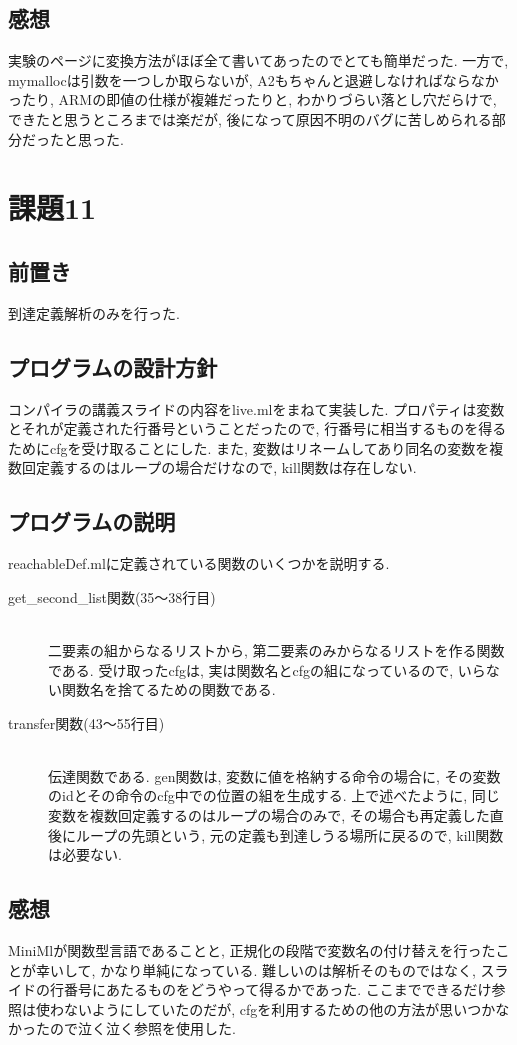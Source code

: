 \documentclass{jarticle}
\begin{document}
\subsection{感想}
実験のページに変換方法がほぼ全て書いてあったのでとても簡単だった. 一方で, mymallocは引数を一つしか取らないが, A2もちゃんと退避しなければならなかったり, ARMの即値の仕様が複雑だったりと, わかりづらい落とし穴だらけで, できたと思うところまでは楽だが, 後になって原因不明のバグに苦しめられる部分だったと思った.


\section{課題11}
\subsection{前置き}
到達定義解析のみを行った. 
\subsection{プログラムの設計方針}
コンパイラの講義スライドの内容をlive.mlをまねて実装した. プロパティは変数とそれが定義された行番号ということだったので, 行番号に相当するものを得るためにcfgを受け取ることにした. また, 変数はリネームしてあり同名の変数を複数回定義するのはループの場合だけなので, kill関数は存在しない. 
\subsection{プログラムの説明}
reachableDef.mlに定義されている関数のいくつかを説明する.
\begin{description}
\item[get\_second\_list関数(35～38行目)] \leavevmode \\
二要素の組からなるリストから, 第二要素のみからなるリストを作る関数である. 受け取ったcfgは, 実は関数名とcfgの組になっているので, いらない関数名を捨てるための関数である.
\item[transfer関数(43～55行目)] \leavevmode \\
伝達関数である. gen関数は, 変数に値を格納する命令の場合に, その変数のidとその命令のcfg中での位置の組を生成する. 上で述べたように, 同じ変数を複数回定義するのはループの場合のみで, その場合も再定義した直後にループの先頭という, 元の定義も到達しうる場所に戻るので, kill関数は必要ない.
\end{description}
\subsection{感想}
MiniMlが関数型言語であることと, 正規化の段階で変数名の付け替えを行ったことが幸いして, かなり単純になっている. 難しいのは解析そのものではなく, スライドの行番号にあたるものをどうやって得るかであった. ここまでできるだけ参照は使わないようにしていたのだが, cfgを利用するための他の方法が思いつかなかったので泣く泣く参照を使用した.
\end{document}
